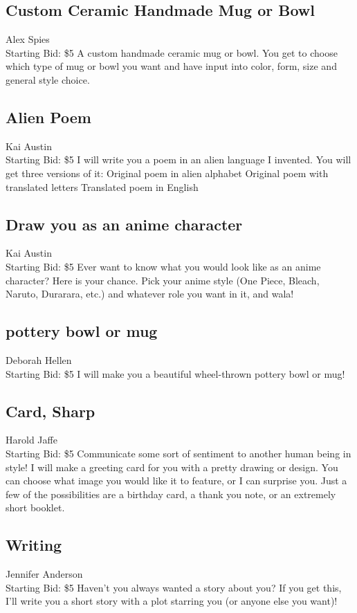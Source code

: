 \documentclass[11pt]{article}
\begin{document}
\subsection{Custom Ceramic Handmade Mug or Bowl}
Alex Spies
\\
Starting Bid: \$5
\newline
A custom handmade ceramic mug or bowl. You get to choose which type of mug or bowl you want and have input into color, form, size and general style choice.
\subsection{Alien Poem}
Kai Austin
\\
Starting Bid: \$5
\newline
I will write you a poem in an alien language I invented.
You will get three versions of it:
Original poem in alien alphabet
Original poem with translated letters
Translated poem in English
\subsection{Draw you as an anime character}
Kai Austin
\\
Starting Bid: \$5
\newline
Ever want to know what you would look like as an anime character? Here is your chance. Pick your anime style (One Piece, Bleach, Naruto, Durarara, etc.) and whatever role you want in it, and wala!
\subsection{pottery bowl or mug}
Deborah Hellen
\\
Starting Bid: \$5
\newline
I will make you  a beautiful wheel-thrown pottery bowl or mug!
\subsection{Card, Sharp}
Harold Jaffe
\\
Starting Bid: \$5
\newline
Communicate some sort of sentiment to another human being in style! I will make a greeting card for you with a pretty drawing or design. You can choose what image you would like it to feature, or I can surprise you. Just a few of the possibilities are a birthday card, a thank you note, or an extremely short booklet.
\subsection{Writing}
Jennifer Anderson
\\
Starting Bid: \$5
\newline
Haven't you always wanted a story about you? If you get this, I'll write you a short story with a plot starring you (or anyone else you want)!
\end{document}
